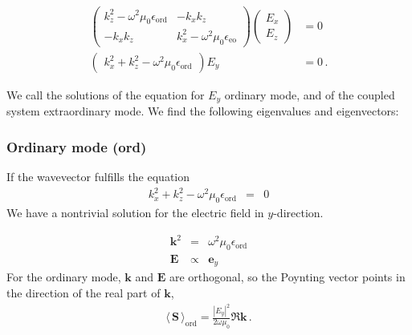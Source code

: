 \documentclass[12pt,a4paper,twoside,openright,BCOR10mm,headsepline,titlepage,abstracton,chapterprefix,final]{scrreprt}
\newcommand\Vector[1]{{\mathbf{#1}}}
\newcommand\vacuum{0}
\newcommand\wavenumber{k}
\newcommand\Wavevector{\Vector{\wavenumber}}
\newcommand\scalarEfield{E}
\newcommand\Efield{\Vector{\scalarEfield}}
\newcommand\vacuumpermeability{\mu_{\vacuum}}
\newcommand\scalarpermittivity{\epsilon}
\newcommand\ordi{\text{ord}}
\newcommand\eo{\text{eo}}
\newcommand{\timeavg}[1]{{\langle\,#1\,\rangle}}
\begin{document}
\begin{align}
\begin{pmatrix}
 \wavenumber_z^2 - \omega^2 \vacuumpermeability \scalarpermittivity_{\ordi} 
 &
 - \wavenumber_x \wavenumber_z 
 \\
 - \wavenumber_x \wavenumber_z 
 &
 \wavenumber_x^2 - \omega^2 \vacuumpermeability \scalarpermittivity_{\eo}  
\end{pmatrix} 
\begin{pmatrix}
 \scalarEfield_x 
 \\
 \scalarEfield_z
\end{pmatrix}
&= 0
\\
\begin{pmatrix} \wavenumber_x^2 + \wavenumber_z^2 - \omega^2 \vacuumpermeability \scalarpermittivity_{\ordi} \end{pmatrix} \scalarEfield_y &= 0\,.
\end{align}

We call the solutions of the equation for $\scalarEfield_y$ ordinary mode, and of the coupled system extraordinary mode.
We find the following eigenvalues and eigenvectors:
\subsubsection{Ordinary mode (ord)}

If the wavevector fulfills the equation
\begin{eqnarray}
  \wavenumber_x^2 + \wavenumber_z^2 - \omega^2 \vacuumpermeability \scalarpermittivity_{\ordi} &=& 0 
\end{eqnarray}
We have a nontrivial solution for the electric field in $y$-direction.

\begin{eqnarray}
 \Wavevector^2 &=& \omega^2 \vacuumpermeability \scalarpermittivity_{\ordi} 
 \\
 \Efield &\propto& \Vector{e}_y
\end{eqnarray}
For the ordinary mode, $\Wavevector$ and $\Efield$ are orthogonal, so the Poynting vector points in the direction of the real part of $\Wavevector$,
\begin{eqnarray}
 \timeavg{\Vector{S}}_\ordi = \frac{ |\scalarEfield_y|^2 }{ 2\omega\vacuumpermeability } \Re \Wavevector\,.\label{eq:Suniaxialordi}
\end{eqnarray}
\end{document}
